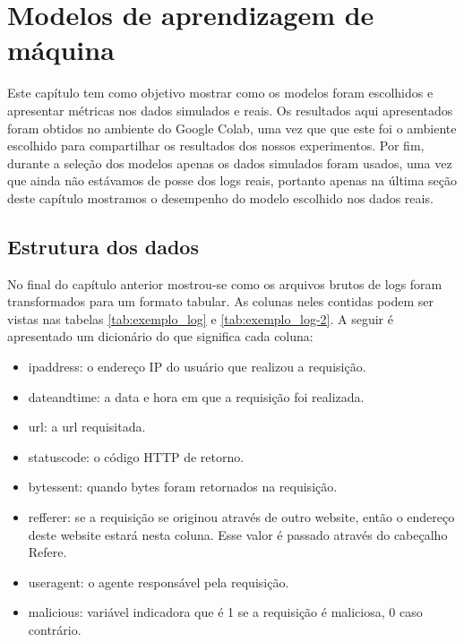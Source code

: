 
\chapter{Modelos de aprendizagem de máquina}
\label{cap:models}

Este capítulo tem como objetivo mostrar como os modelos foram escolhidos e apresentar
métricas nos dados simulados e reais. Os resultados aqui apresentados foram obtidos no 
ambiente do Google Colab, uma vez que que este foi o ambiente escolhido para compartilhar 
os resultados dos nossos experimentos. Por fim, durante a seleção dos modelos apenas os dados 
simulados foram usados, uma vez que ainda não estávamos de posse dos logs reais, portanto 
apenas na última seção deste capítulo mostramos o desempenho do modelo escolhido nos dados reais.


\section{Estrutura dos dados}

No final do capítulo anterior mostrou-se como os arquivos brutos de logs foram transformados
para um formato tabular. As colunas neles contidas podem ser vistas nas tabelas \ref{tab:exemplo_log} e \ref{tab:exemplo_log-2}. 
A seguir é apresentado um dicionário do que significa cada coluna:


\begin{itemize}
    \item ipaddress: o endereço IP do usuário que realizou a requisição.
    \item dateandtime: a data e hora em que a requisição foi realizada.
    \item url: a url requisitada.
    \item statuscode: o código HTTP de retorno.
    \item bytessent: quando bytes foram retornados na requisição.
    \item refferer: se a requisição se originou através de outro website, então o endereço deste 
    website estará nesta coluna. Esse valor é passado através do cabeçalho Refere.
    \item useragent: o agente responsável pela requisição.
    \item malicious: variável indicadora que é 1 se a requisição é maliciosa, 0 caso contrário.
\end{itemize}


